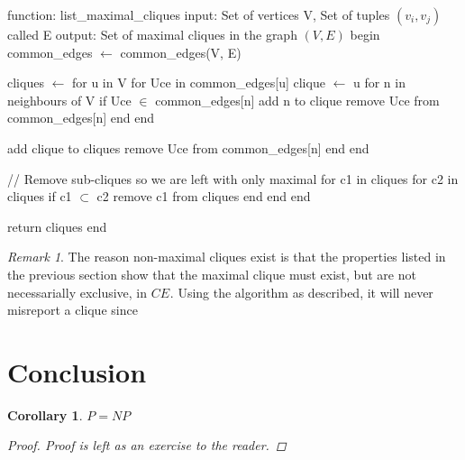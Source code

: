 \documentclass{article}
\theoremstyle{plain}
\newtheorem{cor}[thm]{Corollary}
\theoremstyle{definition}
\theoremstyle{remark}
\newtheorem*{rem}{Remark}
\newcommand{\ce}[1]{ {{CE}_{#1}} }
\begin{document}
\begin{algorithm}[caption={List Maximal Cliques}, label={algo_list_cliques}]
function: list_maximal_cliques
    input: Set of vertices V, Set of tuples $(v_i, v_j)$ called E
    output: Set of maximal cliques in the graph $(V, E)$
    begin
        common_edges $\gets$ common_edges(V, E)

        cliques $\gets$ {}
        for u in V
            for Uce in common_edges[u]
                clique $\gets$ {u}
                for n in neighbours of V
                    if Uce $\in$ common_edges[n]
                        add n to clique
                        remove Uce from common_edges[n]
                    end
                end

                add clique to cliques
                remove Uce from common_edges[n]
            end
        end

        // Remove sub-cliques so we are left with only maximal
        for c1 in cliques
            for c2 in cliques
                if c1 $\subset$ c2
                    remove c1 from cliques
                end
            end
        end

        return cliques
    end
\end{algorithm}

\begin{rem}
    The reason non-maximal cliques exist is that the properties listed in the previous
    section show that the maximal clique must exist, but are not necessarially
    exclusive, in \(\ce{}\). Using the algorithm as described, it will never misreport a
    clique since
\end{rem}

\section{Conclusion}

\begin{cor}
    \(P = NP\)
    \begin{proof}
        Proof is left as an exercise to the reader.
    \end{proof}
\end{cor}
\end{document}
